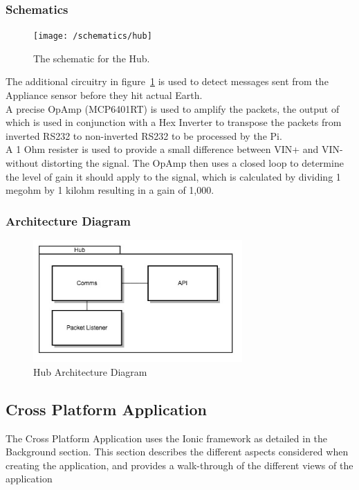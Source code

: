 \documentclass[draft,preprint,12pt,3p]{elsarticle}
\begin{document}
\subsubsection{Schematics}
\begin{figure}[H]
    \centering
    \texttt{[image: /schematics/hub]}
    \caption{The schematic for the Hub.}
    \label{fig:hubschematic}
\end{figure}
The additional circuitry in figure~\ref{fig:hubschematic} is used to detect messages sent from the Appliance sensor before they hit actual Earth.\\
A precise OpAmp (MCP6401RT) is used to amplify the packets, the output of which is used in conjunction with a Hex Inverter to transpose the packets from inverted RS232 to non-inverted RS232 to be processed by the Pi.\\
A 1 Ohm resister is used to provide a small difference between VIN+ and VIN- without distorting the signal. The OpAmp then uses a closed loop to determine the level of gain it should apply to the signal, which is calculated by dividing 1 megohm by 1 kilohm  resulting in a gain of 1,000.

\subsubsection{Architecture Diagram}
\begin{figure}[H]
    \centering
    \includegraphics[width=8cm]{diagrams/hub}
    \caption {Hub Architecture Diagram}
\end{figure}


\clearpage
\subsection{Cross Platform Application}
The Cross Platform Application uses the Ionic framework as detailed in the Background section. This section describes the different aspects considered when creating the application, and provides a walk-through of the different views of the application
\end{document}
